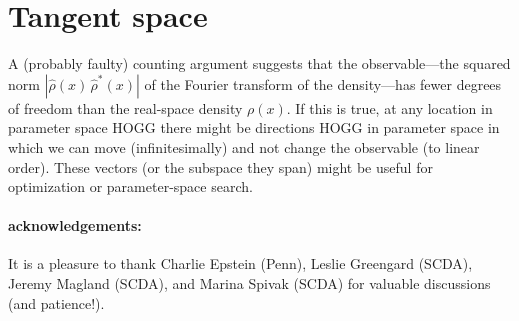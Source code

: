 \documentclass[12pt]{article}
\begin{document}
\section{Tangent space}

A (probably faulty) counting argument suggests that the
observable---the squared norm $|\hat{\rho}(x)\,\hat{\rho}^{\ast}(x)|$
of the Fourier transform of the density---has fewer degrees of freedom
than the real-space density $\rho(x)$.
If this is true, at any location in parameter space HOGG there might
be directions HOGG in parameter space in which we can move
(infinitesimally) and not change the observable (to linear order).
These vectors (or the subspace they span) might be useful for
optimization or parameter-space search.

\paragraph{acknowledgements:}
It is a pleasure to thank
  Charlie Epstein (Penn),
  Leslie Greengard (SCDA),
  Jeremy Magland (SCDA),
  and
  Marina Spivak (SCDA)
for valuable discussions (and patience!).
\end{document}
